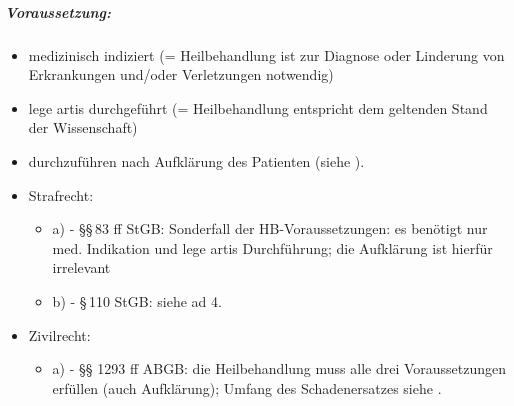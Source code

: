 


\subparagraph{Voraussetzung:}

\begin{itemize}
    \item medizinisch indiziert (= Heilbehandlung ist zur Diagnose oder Linderung von Erkrankungen und/oder Verletzungen notwendig)
    \item lege artis durchgeführt (= Heilbehandlung entspricht dem geltenden Stand der Wissenschaft)
    \item durchzuführen nach Aufklärung des Patienten
    (siehe ).
\end{itemize}


\begin{itemize}
    \item Strafrecht:
    
    \begin{itemize}
        \item a)  - {\S}{\S}\,83 ff StGB: Sonderfall der HB-Voraussetzungen: es benötigt nur med. Indikation und lege artis Durchführung; die Aufklärung ist hierfür irrelevant
        
        \item b)  - {\S}\,110 StGB: siehe ad 4.
        
    \end{itemize}
    \item Zivilrecht:
    \begin{itemize}
        \item a)  - {\S}{\S}
        1293 ff ABGB: die Heilbehandlung muss alle drei
        Voraussetzungen erfüllen (auch Aufklärung);
        Umfang des Schadenersatzes siehe .
    \end{itemize}
    
\end{itemize}

